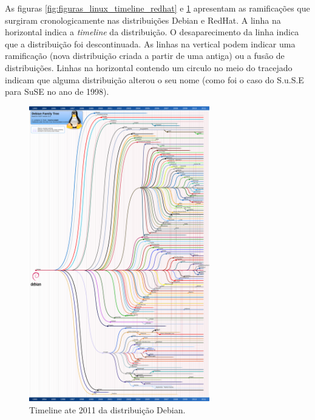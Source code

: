 \begin{anexosenv}

As figuras \ref{fig:figuras_linux_timeline_redhat}  e \ref{fig:figuras_linux_timeline_debian} apresentam as ramificações que surgiram cronologicamente nas distribuições Debian e RedHat. A linha na horizontal indica a \textit{timeline} da distribuição. O desaparecimento da linha indica que a distribuição foi descontinuada. As linhas na vertical podem indicar uma ramificação (nova distribuição criada a partir de uma antiga) ou a fusão de distribuições. Linhas na horizontal contendo um circulo no meio do tracejado indicam que alguma distribuição alterou o seu  nome (como foi o caso do S.u.S.E para SuSE no ano de 1998). 


\begin{figure}[h]
  \centering
	\includegraphics[width=0.7\textwidth]{figuras/debian-timeline}
  \caption[Timeline Debian]{Timeline ate 2011 da distribuição Debian\protect\footnotemark.}
  \label{fig:figuras_linux_timeline_debian}
\end{figure}


\end{anexosenv}
